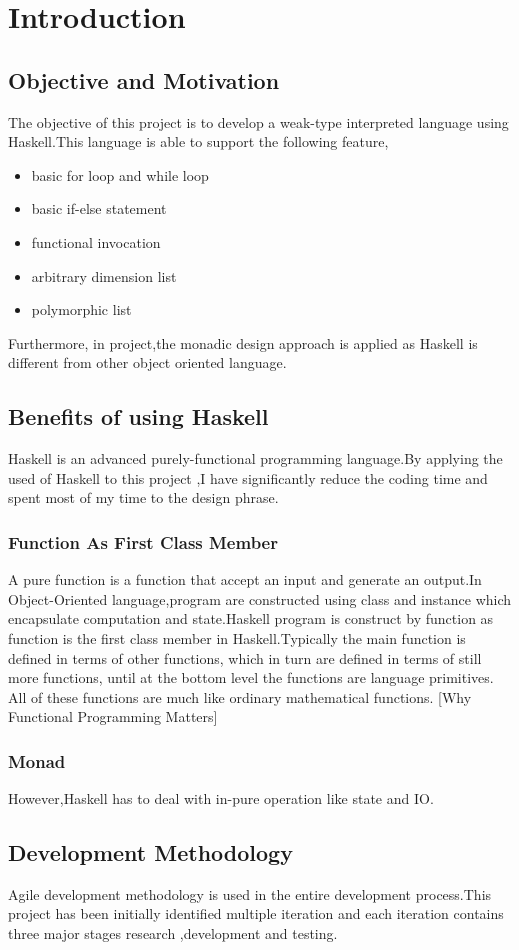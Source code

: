 \chapter{Introduction}
\section{Objective and Motivation}
The objective of this project is to develop a weak-type interpreted language using Haskell.This language is able to support the following feature,
\begin{itemize}
\item basic for loop and while loop
\item basic if-else statement
\item functional invocation 
\item arbitrary dimension list
\item polymorphic list
\end{itemize}

Furthermore, in project,the monadic design approach is applied as Haskell is different from other object oriented language.

\section{Benefits of using Haskell} 
Haskell is an advanced purely-functional programming language.By applying the used of Haskell to this project ,I have significantly reduce the coding time and spent most of my time to the design phrase.
\subsection{Function As First Class Member}
A pure function is a function that accept an input and generate  an output.In Object-Oriented language,program are constructed using class and instance which encapsulate computation and state.Haskell program is construct by function as function is the first class member in Haskell.Typically the main function is defined in terms of
other functions, which in turn are defined in terms of still more functions, until at the bottom level the functions are language primitives. All of these functions are much like ordinary mathematical functions.
[Why Functional Programming Matters]

\subsection{Monad}
However,Haskell has to deal with in-pure operation like state and IO.

\section{Development Methodology}
Agile development methodology is used in the entire development process.This project has been initially identified multiple iteration and each iteration contains three major stages research ,development and testing.